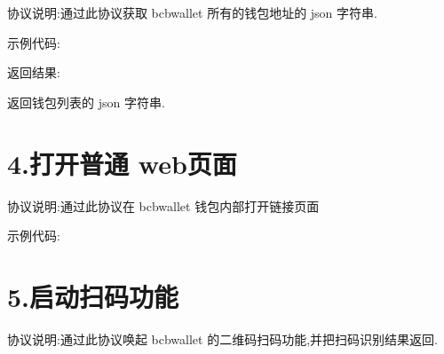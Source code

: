 \documentclass[letterpaper,10pt,english]{sphinxmanual}
\begin{document}
协议说明:通过此协议获取 bcbwallet 所有的钱包地址的 json 字符串.

示例代码:

\begin{sphinxVerbatim}[commandchars=\\\{\}]
   
\end{sphinxVerbatim}

返回结果:

返回钱包列表的 json 字符串.


\section{4.打开普通 web页面}
\label{\detokenize{bcbwallet protocol:web}}
\begin{sphinxVerbatim}[commandchars=\\\{\}]
\end{sphinxVerbatim}

协议说明:通过此协议在 bcbwallet 钱包内部打开链接页面

示例代码:

\begin{sphinxVerbatim}[commandchars=\\\{\}]
\end{sphinxVerbatim}


\section{5.启动扫码功能}
\label{\detokenize{bcbwallet protocol:id5}}
\begin{sphinxVerbatim}[commandchars=\\\{\}]
\end{sphinxVerbatim}

协议说明:通过此协议唤起 bcbwallet 的二维码扫码功能,并把扫码识别结果返回.
\end{document}
